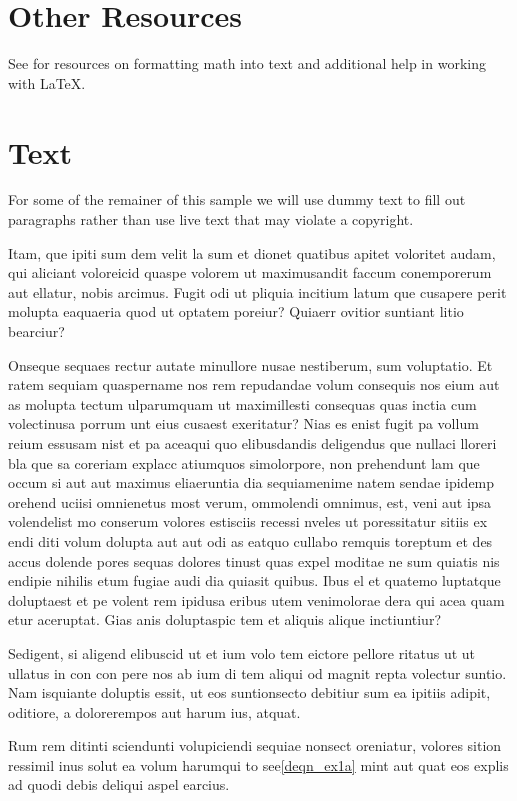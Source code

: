 \documentclass[lettersize,journal]{IEEEtran}
\begin{document}
\section{Other Resources}
See \cite{ref1,ref2,ref3,ref4,ref5} for resources on formatting math into text and additional help in working with \LaTeX .

\section{Text}
For some of the remainer of this sample we will use dummy text to fill out paragraphs rather than use live text that may violate a copyright.

Itam, que ipiti sum dem velit la sum et dionet quatibus apitet voloritet audam, qui aliciant voloreicid quaspe volorem ut maximusandit faccum conemporerum aut ellatur, nobis arcimus.
Fugit odi ut pliquia incitium latum que cusapere perit molupta eaquaeria quod ut optatem poreiur? Quiaerr ovitior suntiant litio bearciur?

Onseque sequaes rectur autate minullore nusae nestiberum, sum voluptatio. Et ratem sequiam quaspername nos rem repudandae volum consequis nos eium aut as molupta tectum ulparumquam ut maximillesti consequas quas inctia cum volectinusa porrum unt eius cusaest exeritatur? Nias es enist fugit pa vollum reium essusam nist et pa aceaqui quo elibusdandis deligendus que nullaci lloreri bla que sa coreriam explacc atiumquos simolorpore, non prehendunt lam que occum\cite{ref6} si aut aut maximus eliaeruntia dia sequiamenime natem sendae ipidemp orehend uciisi omnienetus most verum, ommolendi omnimus, est, veni aut ipsa volendelist mo conserum volores estisciis recessi nveles ut poressitatur sitiis ex endi diti volum dolupta aut aut odi as eatquo cullabo remquis toreptum et des accus dolende pores sequas dolores tinust quas expel moditae ne sum quiatis nis endipie nihilis etum fugiae audi dia quiasit quibus.
\IEEEpubidadjcol
Ibus el et quatemo luptatque doluptaest et pe volent rem ipidusa eribus utem venimolorae dera qui acea quam etur aceruptat.
Gias anis doluptaspic tem et aliquis alique inctiuntiur?

Sedigent, si aligend elibuscid ut et ium volo tem eictore pellore ritatus ut ut ullatus in con con pere nos ab ium di tem aliqui od magnit repta volectur suntio. Nam isquiante doluptis essit, ut eos suntionsecto debitiur sum ea ipitiis adipit, oditiore, a dolorerempos aut harum ius, atquat.

Rum rem ditinti sciendunti volupiciendi sequiae nonsect oreniatur, volores sition ressimil inus solut ea volum harumqui to see\eqref{deqn_ex1a} mint aut quat eos explis ad quodi debis deliqui aspel earcius.
\end{document}
